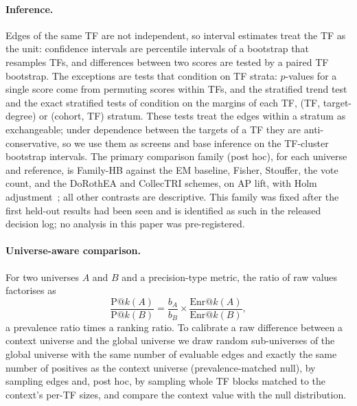 \documentclass[11pt,a4paper]{article}
\begin{document}
\paragraph{Inference.}
Edges of the same TF are not independent, so interval estimates treat the TF as the unit: confidence intervals are percentile intervals of a bootstrap that resamples TFs, and differences between two scores are tested by a paired TF bootstrap.
The exceptions are tests that condition on TF strata: $p$-values for a single score come from permuting scores within TFs, and the stratified trend test and the exact stratified tests of  condition on the margins of each TF, (TF, target-degree) or (cohort, TF) stratum. These tests treat the edges within a stratum as exchangeable; under dependence between the targets of a TF they are anti-conservative, so we use them as screens and base inference on the TF-cluster bootstrap intervals.
The primary comparison family (post hoc), for each universe and reference, is Family-HB against the EM baseline, Fisher, Stouffer, the vote count, and the DoRothEA and CollecTRI schemes, on AP lift, with Holm adjustment~\citep{holm1979simple}; all other contrasts are descriptive.
This family was fixed after the first held-out results had been seen and is identified as such in the released decision log; no analysis in this paper was pre-registered.

\paragraph{Universe-aware comparison.}
For two universes $A$ and $B$ and a precision-type metric, the ratio of raw values factorises as
\begin{equation}
  \frac{\mathrm{P}@k(A)}{\mathrm{P}@k(B)}=\frac{b_A}{b_B}\times\frac{\mathrm{Enr}@k(A)}{\mathrm{Enr}@k(B)},
  \label{eq:decomp}
\end{equation}
a prevalence ratio times a ranking ratio.
To calibrate a raw difference between a context universe and the global universe we draw random sub-universes of the global universe with the same number of evaluable edges and exactly the same number of positives as the context universe (prevalence-matched null), by sampling edges and, post hoc, by sampling whole TF blocks matched to the context's per-TF sizes, and compare the context value with the null distribution.
\end{document}
